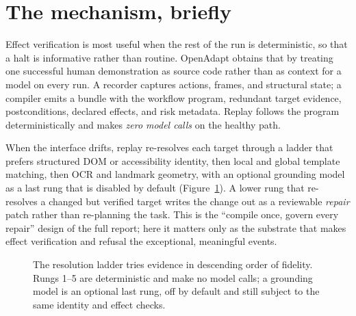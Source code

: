 \documentclass[10pt]{article}
\newcommand{\system}{OpenAdapt}
\begin{document}
\section{The mechanism, briefly}
\label{sec:mechanism}

Effect verification is most useful when the rest of the run is deterministic, so
that a halt is informative rather than routine. \system{} obtains that by
treating one successful human demonstration as source code rather than as context
for a model on every run. A recorder captures actions, frames, and structural
state; a compiler emits a bundle with the workflow program, redundant target
evidence, postconditions, declared effects, and risk metadata. Replay follows the
program deterministically and makes \emph{zero model calls} on the healthy path.

When the interface drifts, replay re-resolves each target through a ladder that
prefers structured DOM or accessibility identity, then local and global template
matching, then OCR and landmark geometry, with an optional grounding model as a
last rung that is disabled by default (Figure~\ref{fig:ladder}). A lower rung
that re-resolves a changed but verified target writes the change out as a
reviewable \emph{repair} patch rather than re-planning the task. This is the
``compile once, govern every repair'' design of the full report; here it matters
only as the substrate that makes effect verification and refusal the exceptional,
meaningful events.

\begin{figure}[t]
\centering
{}
\caption{The resolution ladder tries evidence in descending order of fidelity.
Rungs 1--5 are deterministic and make no model calls; a grounding model is an
optional last rung, off by default and still subject to the same identity and
effect checks.}
\label{fig:ladder}
\end{figure}
\end{document}
